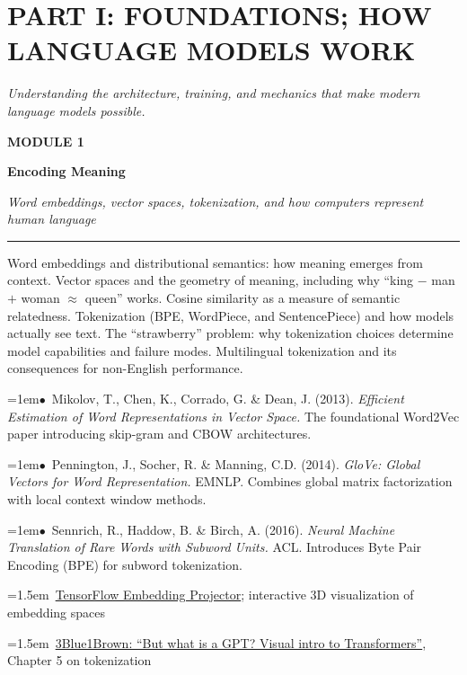 \documentclass[11pt, a4paper]{article}
\newcommand{\modulehead}[3]{%
  \vspace{0.5em}
  {\small\sffamily\bfseries\textcolor{accent}{MODULE #1}}\par\vspace{-0.3em}
  {\Large\sffamily\bfseries\textcolor{dark}{#2}}\par\vspace{-0.2em}
  {\small\textit{\textcolor{muted}{#3}}}\par
  \vspace{0.2em}\textcolor{bordercol}{\rule{\textwidth}{0.3pt}}\par
}
\newcommand{\seclabel}[1]{%
  \vspace{0.6em}{\normalsize\sffamily\bfseries\textcolor{accent}{#1}}\par\vspace{0.2em}
}
\newcommand{\refpaper}[1]{%
  \par\hangindent=1em\hangafter=1\noindent\textcolor{accent}{\small$\bullet$}~{\small #1}\par
}
\newcommand{\resource}[1]{%
  \par\hangindent=1.5em\hangafter=1\noindent\hspace{0.5em}{\small\textcolor{accent}{\guilsinglright}}~{\small #1}\par
}
\begin{document}
\newpage
\section{PART I: FOUNDATIONS; HOW LANGUAGE MODELS WORK}
{\textit{\textcolor{muted}{Understanding the architecture, training, and mechanics that make modern language models possible.}}}

\vspace{1em}

\modulehead{1}{Encoding Meaning}{Word embeddings, vector spaces, tokenization, and how computers represent human language}

\seclabel{Core Concepts}

Word embeddings and distributional semantics: how meaning emerges from context. Vector spaces and the geometry of meaning, including why ``king $-$ man $+$ woman $\approx$ queen'' works. Cosine similarity as a measure of semantic relatedness. Tokenization (BPE, WordPiece, and SentencePiece) and how models actually see text. The ``strawberry'' problem: why tokenization choices determine model capabilities and failure modes. Multilingual tokenization and its consequences for non-English performance.

\seclabel{Core Readings}

\refpaper{Mikolov, T., Chen, K., Corrado, G. \& Dean, J. (2013). \textit{Efficient Estimation of Word Representations in Vector Space.} The foundational Word2Vec paper introducing skip-gram and CBOW architectures.}

\refpaper{Pennington, J., Socher, R. \& Manning, C.D. (2014). \textit{GloVe: Global Vectors for Word Representation.} EMNLP. Combines global matrix factorization with local context window methods.}

\refpaper{Sennrich, R., Haddow, B. \& Birch, A. (2016). \textit{Neural Machine Translation of Rare Words with Subword Units.} ACL. Introduces Byte Pair Encoding (BPE) for subword tokenization.}

\seclabel{Further Resources}

\resource{\href{https://projector.tensorflow.org}{TensorFlow Embedding Projector}; interactive 3D visualization of embedding spaces}

\resource{\href{https://www.youtube.com/watch?v=wjZofJX0v4M}{3Blue1Brown: ``But what is a GPT? Visual intro to Transformers''}, Chapter 5 on tokenization}
\end{document}
